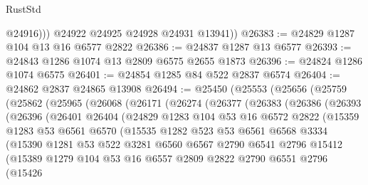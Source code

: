 \begin{lexlean}{RustStd}
\begin{coremodule}
              @24916)))
        @24922
        @24925
        @24928
        @24931
        @13941))
@26383 := @24829 @1287 @104 @13 @16 @6577 @2822
@26386 := @24837 @1287 @13 @6577
@26393 := @24843 @1286 @1074 @13 @2809 @6575 @2655 @1873
@26396 := @24824 @1286 @1074 @6575
@26401 := @24854 @1285 @84 @522 @2837 @6574
@26404 := @24862 @2837 @24865 @13908
@26494 := @25450
    (@25553
      (@25656
        (@25759
          (@25862
            (@25965
              (@26068
                (@26171
                  (@26274
                    (@26377
                      (@26383
                        (@26386
                          (@26393
                            (@26396
                              (@26401
                                @26404
                                (@24829
                                  @1283
                                  @104
                                  @53
                                  @16
                                  @6572
                                  @2822
                                  (@15359
                                    @1283
                                    @53
                                    @6561
                                    @6570
                                    (@15535
                                      @1282
                                      @523
                                      @53
                                      @6561
                                      @6568
                                      @3334
                                      (@15390
                                        @1281
                                        @53
                                        @522
                                        @3281
                                        @6560
                                        @6567
                                        @2790
                                        @6541
                                        @2796
                                        @15412
                                        (@15389
                                          @1279
                                          @104
                                          @53
                                          @16
                                          @6557
                                          @2809
                                          @2822
                                          @2790
                                          @6551
                                          @2796
                                          (@15426

\end{coremodule}
\end{lexlean}
